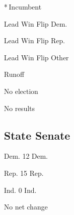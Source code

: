* Incumbent~

 Lead Win Flip Dem.

 Lead Win Flip Rep.

 Lead Win Flip Other

 Runoff

 No election

 No results

\hypertarget{state-senate}{%
\subsection{State Senate}\label{state-senate}}

Dem. 12 Dem.

Rep. 15 Rep.

Ind. 0 Ind.

No net change

